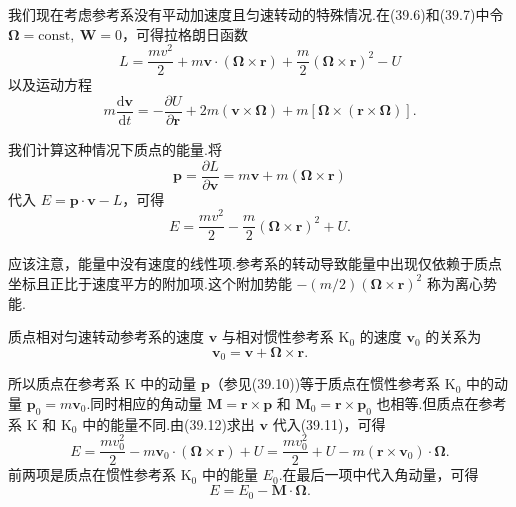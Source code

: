 我们现在考虑参考系没有平动加速度且匀速转动的特殊情况.在(39.6)和(39.7)中令 $\boldsymbol{\Omega}=\mathrm{const},\ \boldsymbol{W}=0$，可得拉格朗日函数
\begin{equation}
  L=\frac{mv^2}{2}
  +m\boldsymbol{v}\cdot(\boldsymbol{\Omega}\times\boldsymbol{r})
  +\frac{m}{2}(\boldsymbol{\Omega}\times\boldsymbol{r})^2-U
\end{equation}
以及运动方程
\begin{equation}
  m\frac{\mathrm{d}\boldsymbol{v}}{\mathrm{d}t}
  =-\frac{\partial U}{\partial\boldsymbol{r}}
  +2m\left(\boldsymbol{v}\times\boldsymbol{\Omega}\right)
  +m\left[\boldsymbol{\Omega}\times\left(\boldsymbol{r}\times\boldsymbol{\Omega}\right)\right].
\end{equation}

我们计算这种情况下质点的能量.将
\begin{equation}
  \boldsymbol{p}=\frac{\partial L}{\partial\boldsymbol{v}}
  =m\boldsymbol{v}+m\left(\boldsymbol{\Omega}\times\boldsymbol{r}\right)
\end{equation}
代入 $E=\boldsymbol{p}\cdot\boldsymbol{v}-L$，可得
\begin{equation}
  E=\frac{mv^2}{2}
  -\frac{m}{2}\left(\boldsymbol{\Omega}\times\boldsymbol{r}\right)^2
  +U.
\end{equation}

应该注意，能量中没有速度的线性项.参考系的转动导致能量中出现仅依赖于质点坐标且正比于速度平方的附加项.这个附加势能
$-(m/2)(\boldsymbol{\Omega}\times\boldsymbol{r})^2$
称为离心势能.

质点相对匀速转动参考系的速度 $\boldsymbol{v}$ 与相对惯性参考系 $\mathrm{K}_0$ 的速度 $\boldsymbol{v}_0$ 的关系为
\begin{equation}
  \boldsymbol{v}_0=\boldsymbol{v}
  +\boldsymbol{\Omega}\times\boldsymbol{r}.
\end{equation}

所以质点在参考系 $\mathrm{K}$ 中的动量 $\boldsymbol{p}$（参见(39.10))等于质点在惯性参考系 $\mathrm{K}_0$ 中的动量
$\boldsymbol{p}_0=m\boldsymbol{v}_0$.同时相应的角动量
$\boldsymbol{M}=\boldsymbol{r}\times\boldsymbol{p}$ 和
$\boldsymbol{M}_0=\boldsymbol{r}\times\boldsymbol{p}_0$ 也相等.但质点在参考系 $\mathrm{K}$ 和 $\mathrm{K}_0$ 中的能量不同.由(39.12)求出 $\boldsymbol{v}$ 代入(39.11)，可得
\begin{equation*}
  E=\frac{mv_0^2}{2}
  -m\boldsymbol{v}_0\cdot(\boldsymbol{\Omega}\times\boldsymbol{r})+U
  =\frac{mv_0^2}{2}+U
  -m\left(\boldsymbol{r}\times\boldsymbol{v}_0\right)\cdot\boldsymbol{\Omega}.
\end{equation*}
前两项是质点在惯性参考系 $\mathrm{K}_0$ 中的能量 $E_0$.在最后一项中代入角动量，可得
\begin{equation}
  E=E_0-\boldsymbol{M}\cdot\boldsymbol{\Omega}.
\end{equation}

